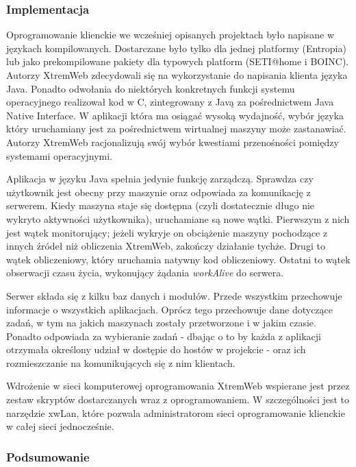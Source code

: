 \documentclass[12pt,a4paper,twoside]{article}
\begin{document}
\subsubsection{Implementacja}

Oprogramowanie klienckie we wcześniej opisanych projektach było napisane w językach kompilowanych. Dostarczane było tylko dla jednej platformy (Entropia) lub jako prekompilowane pakiety dla typowych platform (SETI@home i BOINC). Autorzy XtremWeb zdecydowali się na wykorzystanie do napisania klienta języka Java. Ponadto odwołania do niektórych konkretnych funkcji systemu operacyjnego realizował kod w C, zintegrowany z Javą za pośrednictwem Java Native Interface. W aplikacji która ma osiągać wysoką wydajność, wybór języka który uruchamiany jest za pośrednictwem wirtualnej maszyny może zastanawiać. Autorzy XtremWeb racjonalizują swój wybór kwestiami przenośności pomiędzy systemami operacyjnymi.

Aplikacja w języku Java spełnia jedynie funkcję zarządczą. Sprawdza czy użytkownik jest obecny przy maszynie oraz odpowiada za komunikację z serwerem. Kiedy maszyna staje się dostępna (czyli dostatecznie długo nie wykryto aktywności użytkownika), uruchamiane są nowe wątki. Pierwszym z nich jest wątek monitorujący; jeżeli wykryje on obciążenie maszyny pochodzące z innych źródeł niż obliczenia XtremWeb, zakończy działanie tychże. Drugi to wątek obliczeniowy, który uruchamia natywny kod obliczeniowy. Ostatni to wątek obserwacji czasu życia, wykonujący żądania \textit{workAlive} do serwera.

Serwer składa się z kilku baz danych i modułów. Przede wszystkim przechowuje informacje o wszystkich aplikacjach. Oprócz tego przechowuje dane dotyczące zadań, w tym na jakich maszynach zostały przetworzone i w jakim czasie. Ponadto odpowiada za wybieranie zadań - dbając o to by każda z aplikacji otrzymała określony udział w dostępie do hostów w projekcie - oraz ich rozmieszczanie na komunikujących się z nim klientach.

Wdrożenie w sieci komputerowej oprogramowania XtremWeb wspierane jest przez zestaw skryptów dostarczanych wraz z oprogramowaniem. W szczególności jest to narzędzie xwLan, które pozwala administratorom sieci oprogramowanie klienckie w całej sieci jednocześnie.

\subsubsection{Podsumowanie}
\end{document}
